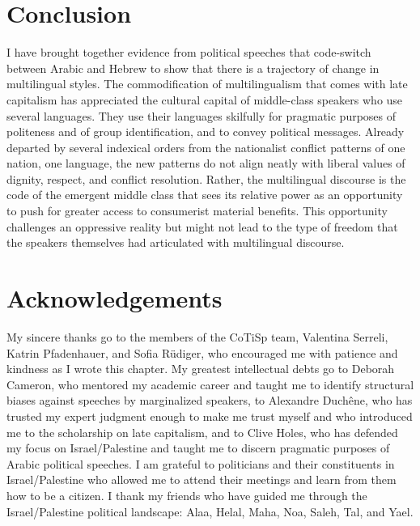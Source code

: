 \documentclass[output=paper,arabicfont]{langscibook}
\begin{document}
\section{Conclusion}
I have brought together evidence from political speeches that code-switch between Arabic and Hebrew to show that there is a trajectory of change in multilingual styles. The commodification of multilingualism that comes with late capitalism has appreciated the cultural capital of middle-class speakers who use several languages. They use their languages skilfully for pragmatic purposes of politeness and of group identification, and to convey political messages. Already departed by several indexical orders from the nationalist conflict patterns of one nation, one language, the new patterns do not align neatly with liberal values of dignity, respect, and conflict resolution. Rather, the multilingual discourse is the code of the emergent middle class that sees its relative power as an opportunity to push for greater access to consumerist material benefits. This opportunity challenges an oppressive reality but might not lead to the type of freedom that the speakers themselves had articulated with multilingual discourse. 

\section*{Acknowledgements}
My sincere thanks go to the members of the CoTiSp team, Valentina Serreli, Katrin Pfadenhauer, and Sofia Rüdiger, who encouraged me with patience and kindness as I wrote this chapter. My greatest intellectual debts go to Deborah Cameron, who mentored my academic career and taught me to identify structural biases against speeches by marginalized speakers, to Alexandre Duchêne, who has trusted my expert judgment enough to make me trust myself and who introduced me to the scholarship on late capitalism, and to Clive Holes, who has defended my focus on Israel/Palestine and taught me to discern pragmatic purposes of Arabic political speeches. I am grateful to politicians and their constituents in Israel/Palestine who allowed me to attend their meetings and learn from them how to be a citizen. I thank my friends who have guided me through the Israel/Palestine political landscape: Alaa, Helal, Maha, Noa, Saleh, Tal, and Yael.

\printbibliography[heading=subbibliography, notkeyword=this]
\end{document}
